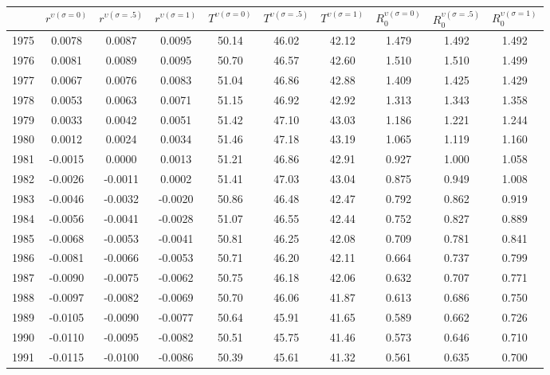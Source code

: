 \begin{tabular}{cccccccccc}
  \hline
 & $r^{\upsilon (\sigma = 0)}$ & $r^{\upsilon (\sigma = .5)}$ & $r^{\upsilon (\sigma = 1)}$ & $T^{\upsilon (\sigma = 0)}$ & $T^{\upsilon (\sigma = .5)}$ & $T^{\upsilon (\sigma = 1)}$ & $R_0^{\upsilon (\sigma = 0)}$ & $R_0^{\upsilon (\sigma = .5)}$ & $R_0^{\upsilon (\sigma = 1)}$ \\ 
  \hline
1975 & 0.0078 & 0.0087 & 0.0095 & 50.14 & 46.02 & 42.12 & 1.479 & 1.492 & 1.492 \\ 
  1976 & 0.0081 & 0.0089 & 0.0095 & 50.70 & 46.57 & 42.60 & 1.510 & 1.510 & 1.499 \\ 
  1977 & 0.0067 & 0.0076 & 0.0083 & 51.04 & 46.86 & 42.88 & 1.409 & 1.425 & 1.429 \\ 
  1978 & 0.0053 & 0.0063 & 0.0071 & 51.15 & 46.92 & 42.92 & 1.313 & 1.343 & 1.358 \\ 
  1979 & 0.0033 & 0.0042 & 0.0051 & 51.42 & 47.10 & 43.03 & 1.186 & 1.221 & 1.244 \\ 
  1980 & 0.0012 & 0.0024 & 0.0034 & 51.46 & 47.18 & 43.19 & 1.065 & 1.119 & 1.160 \\ 
  1981 & -0.0015 & 0.0000 & 0.0013 & 51.21 & 46.86 & 42.91 & 0.927 & 1.000 & 1.058 \\ 
  1982 & -0.0026 & -0.0011 & 0.0002 & 51.41 & 47.03 & 43.04 & 0.875 & 0.949 & 1.008 \\ 
  1983 & -0.0046 & -0.0032 & -0.0020 & 50.86 & 46.48 & 42.47 & 0.792 & 0.862 & 0.919 \\ 
  1984 & -0.0056 & -0.0041 & -0.0028 & 51.07 & 46.55 & 42.44 & 0.752 & 0.827 & 0.889 \\ 
  1985 & -0.0068 & -0.0053 & -0.0041 & 50.81 & 46.25 & 42.08 & 0.709 & 0.781 & 0.841 \\ 
  1986 & -0.0081 & -0.0066 & -0.0053 & 50.71 & 46.20 & 42.11 & 0.664 & 0.737 & 0.799 \\ 
  1987 & -0.0090 & -0.0075 & -0.0062 & 50.75 & 46.18 & 42.06 & 0.632 & 0.707 & 0.771 \\ 
  1988 & -0.0097 & -0.0082 & -0.0069 & 50.70 & 46.06 & 41.87 & 0.613 & 0.686 & 0.750 \\ 
  1989 & -0.0105 & -0.0090 & -0.0077 & 50.64 & 45.91 & 41.65 & 0.589 & 0.662 & 0.726 \\ 
  1990 & -0.0110 & -0.0095 & -0.0082 & 50.51 & 45.75 & 41.46 & 0.573 & 0.646 & 0.710 \\ 
  1991 & -0.0115 & -0.0100 & -0.0086 & 50.39 & 45.61 & 41.32 & 0.561 & 0.635 & 0.700 \\ 

\end{tabular}
